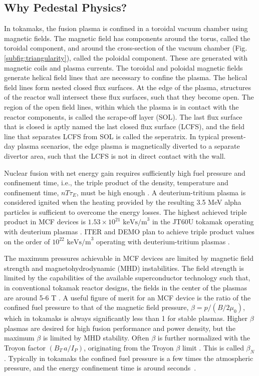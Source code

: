 \documentclass[a4paper, twoside, final, 12pt]{article}
\begin{document}
\subsection{Why Pedestal Physics?}\label{subsec:purpose}
In tokamaks, the fusion plasma is confined in a toroidal vacuum chamber using magnetic fields.
The magnetic field has components around the torus, called the toroidal component, and around the cross-section of the vacuum chamber (Fig. \ref{subfig:triangularity}), called the poloidal component.
These are generated with magnetic coils and plasma currents.
The toroidal and poloidal magnetic fields generate helical field lines that are necessary to confine the plasma.
The helical field lines form nested closed flux surfaces.
At the edge of the plasma, structures of the reactor wall intersect these flux surfaces, such that they become open.
The region of the open field lines, within which the plasma is in contact with the reactor components, is called the scrape-off layer (SOL).
The last flux surface that is closed is aptly named the last closed flux surface (LCFS), and the field line that separates LCFS from SOL is called the seperatrix.
In typical present-day plasma scenarios, the edge plasma is magnetically diverted to a separate divertor area, such that the LCFS is not in direct contact with the wall.

Nuclear fusion with net energy gain requires sufficiently high fuel pressure and confinement time, i.e., the triple product of the density, temperature and confinement time, $nT\tau_E$,  must be high enough \cite{Lawson_1957}. A deuterium-tritium plasma is considered ignited when the heating provided by the resulting 3.5 MeV alpha particles is sufficient to overcome the energy losses. 
The highest achieved triple product in MCF devices is $1.53\times 10^{21}\text{ keVs/m}^3$ in the JT60U tokamak operating with deuterium plasmas \cite{JT60_triple}. ITER and DEMO plan to achieve triple product values on the order of $10^{22}\text{ keVs/m}^3$ operating with deuterium-tritium plasmas \cite{EUROfusionroadmap}.

The maximum pressures achievable in MCF devices are limited by magnetic field strength and magnetohydrodynamic (MHD) instabilities.
The field strength is limited by the capabilities of the available superconductor technology such that, in conventional tokamak reactor designs, the fields in the center of the plasmas are around 5-6 T \cite{zohm_use_2019}. A useful figure of merit for an MCF device is the ratio of the confined fuel pressure to that of the magnetic field pressure, $\beta = p / (B/2\mu_0)$, which in tokamaks is always significantly less than 1 for stable plasmas. Higher $\beta$ plasmas are desired for high fusion performance and power density, but the maximum $\beta$ is limited by MHD stability. Often $\beta$ is further normalized with the Troyon factor $(B_T \, a/ I_P)$, originating from the Troyon $\beta$ limit \cite{Troyon_1988}. This is called $\beta_N$. Typically in tokamaks the confined fuel pressure is a few times the atmospheric pressure, and the energy confinement time is around seconds~\cite{FEDERICI2014882}.
\end{document}
